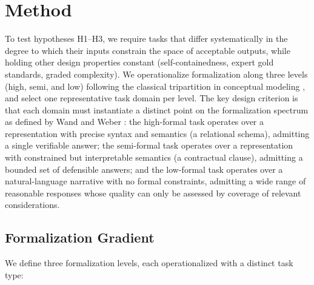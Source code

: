 \documentclass[runningheads]{llncs}
\begin{document}
\section{Method}
\label{sec:method}

To test hypotheses H1--H3, we require tasks that differ systematically in the degree to which their inputs constrain the space of acceptable outputs, while holding other design properties constant (self-containedness, expert gold standards, graded complexity). We operationalize formalization along three levels (high, semi, and low) following the classical tripartition in conceptual modeling \cite{mylopoulos1992conceptual}, and select one representative task domain per level. The key design criterion is that each domain must instantiate a distinct point on the formalization spectrum as defined by Wand and Weber \cite{wand1990ontological}: the high-formal task operates over a representation with precise syntax and semantics (a relational schema), admitting a single verifiable answer; the semi-formal task operates over a representation with constrained but interpretable semantics (a contractual clause), admitting a bounded set of defensible answers; and the low-formal task operates over a natural-language narrative with no formal constraints, admitting a wide range of reasonable responses whose quality can only be assessed by coverage of relevant considerations.

\subsection{Formalization Gradient}
\label{sec:gradient}

We define three formalization levels, each operationalized with a distinct task type:
\end{document}
